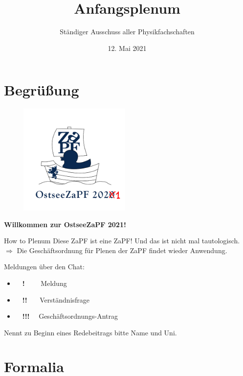\documentclass[compress, aspectratio=169]{beamer}
\title[Anfangsplenum]{Anfangsplenum}
\author{Ständiger Ausschuss aller Physikfachschaften}
\institute[Zusammenkunft aller Physikfachschaften]
\date{12. Mai 2021}
\begin{document}
	
	\section{Begrüßung}
	
	{
		\begin{frame}
			\begin{figure}
				\centering
				\includegraphics[height=5.5cm]{LOGO.png}
			\end{figure}
			\centering
			\textbf{Willkommen zur OstseeZaPF 2021!}
		\end{frame}
	}
	
	\begin{frame}{How to Plenum}
		Diese ZaPF ist eine ZaPF! Und das ist nicht mal tautologisch.\\
		$\Rightarrow$ Die Geschäftsordnung für Plenen der ZaPF findet wieder Anwendung.
		
		\vspace{.5cm}
		Meldungen über den Chat:
		\begin{itemize}
			\item$\quad$\textbf{!}$\quad$ \ \ Meldung
			\item$\quad$\textbf{!!}$\quad$ \ Verständnisfrage
			\item$\quad$\textbf{!!!}$\quad$ Geschäftsordnungs-Antrag
		\end{itemize}
		\vspace{.5cm}
		Nennt zu Beginn eines Redebeitrags bitte Name und Uni.
	\end{frame}
	
	\section{Formalia}
	
\end{document}
